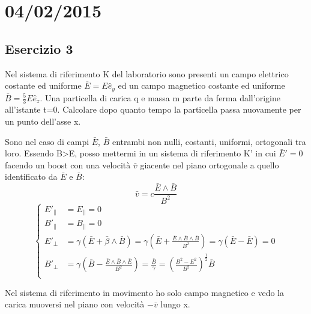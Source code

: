 \chapter*{04/02/2015}
\section*{Esercizio 3}
Nel sistema di riferimento K del laboratorio sono presenti un campo elettrico 
costante ed uniforme $\bar E = E \hat e_y$ ed un campo magnetico costante ed
uniforme $\bar B = \frac{5}{3} E \hat e_z $. Una particella di carica q e massa
m parte da ferma dall'origine all'istante t=0. Calcolare dopo quanto tempo la 
particella passa nuovamente per un punto dell'asse x.

\vspace{5 mm} %

Sono nel caso di campi $\bar E$, $\bar B$ entrambi non nulli, costanti, uniformi,
ortogonali tra loro.
Essendo B>E, posso mettermi in un sistema di riferimento K' in cui $\bar E'=0$
facendo un boost con una velocit\`a $\bar v$ giacente nel piano ortogonale
a quello identificato da $\bar E$ e $\bar B$:
\begin{equation}
\bar v = c \frac{\bar E \wedge \bar B}{B^2}
\end{equation}
\begin{equation}
\begin{cases}
E'_{\parallel} & = E_{\parallel} = 0 \\
B'_{\parallel} & = B_{\parallel} = 0 \\
E'_{\bot} & = \gamma(\bar E + \bar\beta \wedge \bar B)= \gamma(\bar E + \frac{\bar E \wedge \bar B 
\wedge \bar B}{B^2}) = \gamma(\bar E - \bar E) = 0 \\

B'_{\bot} & = \gamma(\bar B - \frac{\bar E \wedge \bar B 
\wedge \bar E}{B^2}) = \frac{\bar B}{\gamma} = (\frac{B^2-E^2}{B^2})^\frac{1}{2} \bar B\\
\end{cases}
\end{equation}

Nel sistema di riferimento in movimento ho solo campo magnetico e vedo la carica muoversi nel
piano con velocit\`a $-\bar v$ lungo x.


